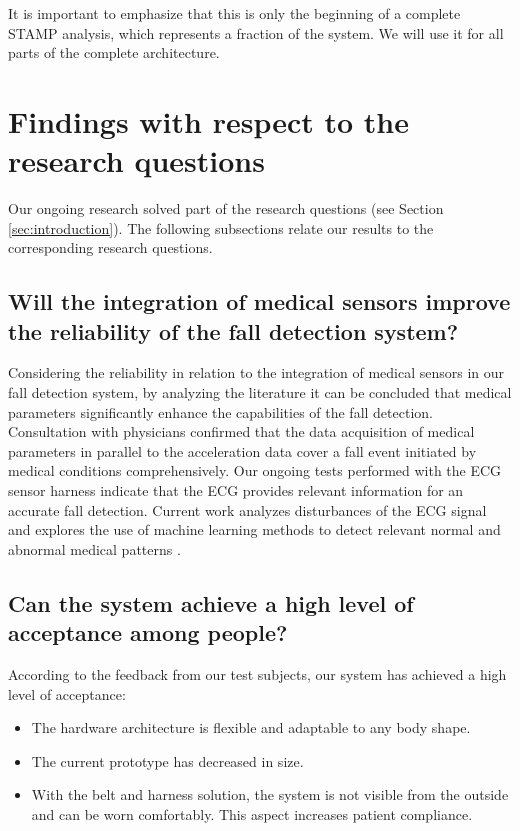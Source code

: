 \documentclass[10pt,journal,compsoc]{IEEEtran}
\begin{document}
It is important to emphasize that this is only the beginning of a complete STAMP analysis, which represents a fraction of the system.  We will use it for all parts of the complete architecture.

\section{Findings with respect to the research questions}
\label{sec:FindingsResearchQuestions}
Our ongoing research solved part of the research questions (see Section \ref{sec:introduction}). The following subsections relate our results to the corresponding research questions.

\subsection{Will the integration of medical sensors improve the reliability of the fall detection system?}
\label{subsec:integrationMedicalSensors}
Considering the reliability in relation to the integration of medical sensors in our fall detection system, by analyzing the literature \cite{Gjoreski2014} it can be concluded that medical parameters significantly enhance the capabilities of the fall detection. Consultation with physicians \cite{DrNicoletteWagner} confirmed that the data acquisition of medical parameters in parallel to the acceleration data cover a fall event initiated by medical conditions comprehensively. Our ongoing tests performed with the ECG sensor harness indicate that the ECG provides relevant information for an accurate fall detection. Current work analyzes disturbances of the ECG signal and explores the use of machine learning methods to detect relevant normal and abnormal medical patterns \cite{FatimaMasterThesis}. 

\subsection{Can the system achieve a high level of acceptance among people?}
\label{subsec:acceptanceSystem}
According to the feedback from our test subjects, our system has achieved a high level of acceptance:
\begin{itemize}
	\item The hardware architecture is flexible and adaptable to any body shape.
	\item The current prototype has decreased in size.
	\item With the belt and harness solution, the system is not visible from the outside and can be worn comfortably. This aspect increases patient compliance.
\end{itemize}
\end{document}
